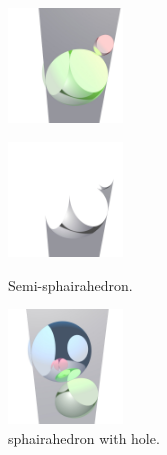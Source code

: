 \documentclass[suppldata, dvipdfmx]{interact}
\theoremstyle{plain}%
\theoremstyle{definition}
\theoremstyle{remark}
\theoremstyle{problemstyle}
\begin{document}
\begin{figure}[h!tbp]
 \begin{minipage}[t]{0.6\textwidth}
  \begin{minipage}[t]{0.3\textwidth}
   \centering
   \includegraphics[width=1.2in, height=1.2in,
   keepaspectratio]{./img/sphairahedralPrism/semiSphairaAll.jpg}
   \label{fig:semi-sphairaAll}
  \end{minipage}
  \hspace*{\fill}
  \begin{minipage}[t]{0.3\textwidth}
   \centering
   \includegraphics[width=1.2in, height=1.2in,
   keepaspectratio]{./img/sphairahedralPrism/semiSphairaHalf.jpg}
   \label{fig:semi-sphairaHalf}
  \end{minipage}
  \hspace*{\fill}
  \caption{Semi-sphairahedron.}
  \label{fig:semi-sphairahedron}
 \end{minipage}
 \begin{minipage}[t]{0.3\textwidth}
  \centering
 \includegraphics[width=1.2in, height=1.2in,
 keepaspectratio]{./img/sphairahedralPrism/hole.jpg}
 \caption{sphairahedron with hole.}
  \label{fig:brokenHole}
 \end{minipage}
\end{figure}
\end{document}
